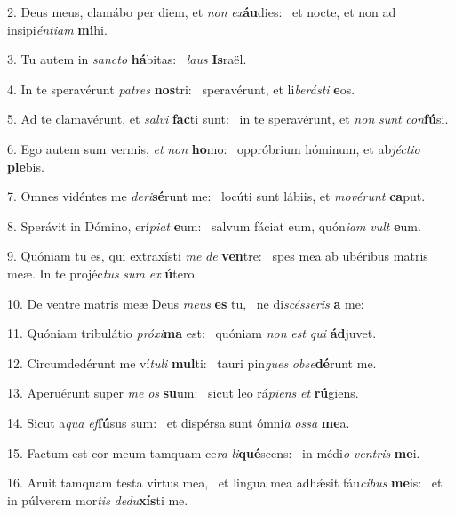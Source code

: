 2. Deus meus, clamábo per diem, et \textit{non} \textit{ex}\textbf{áu}dies: \ast\  et nocte, et non ad insipi\textit{én}\textit{ti}\textit{am} \textbf{mi}hi.\

3. Tu autem in \textit{sanc}\textit{to} \textbf{há}bitas: \ast\  \textit{laus} \textbf{Is}raël.\

4. In te speravérunt \textit{pa}\textit{tres} \textbf{nos}tri: \ast\  speravérunt, et li\textit{be}\textit{rás}\textit{ti} \textbf{e}os.\

5. Ad te clamavérunt, et \textit{sal}\textit{vi} \textbf{fac}ti sunt: \ast\  in te speravérunt, et \textit{non} \textit{sunt} \textit{con}\textbf{fú}si.\

6. Ego autem sum vermis, \textit{et} \textit{non} \textbf{ho}mo: \ast\  oppróbrium hóminum, et ab\textit{jéc}\textit{ti}\textit{o} \textbf{ple}bis.\

7. Omnes vidéntes me \textit{de}\textit{ri}\textbf{sé}runt me: \ast\  locúti sunt lábiis, et \textit{mo}\textit{vé}\textit{runt} \textbf{ca}put.\

8. Sperávit in Dómino, erí\textit{pi}\textit{at} \textbf{e}um: \ast\  salvum fáciat eum, quón\textit{i}\textit{am} \textit{vult} \textbf{e}um.\

9. Quóniam tu es, qui extraxísti \textit{me} \textit{de} \textbf{ven}tre: \ast\  spes mea ab ubéribus matris meæ. In te projéc\textit{tus} \textit{sum} \textit{ex} \textbf{ú}tero.\

10. De ventre matris meæ Deus \textit{me}\textit{us} \textbf{es} tu, \ast\  ne di\textit{scés}\textit{se}\textit{ris} \textbf{a} me:\

11. Quóniam tribulátio \textit{pró}\textit{xi}\textbf{ma} est: \ast\  quóniam \textit{non} \textit{est} \textit{qui} \textbf{ád}juvet.\

12. Circumdedérunt me ví\textit{tu}\textit{li} \textbf{mul}ti: \ast\  tauri pin\textit{gues} \textit{ob}\textit{se}\textbf{dé}runt me.\

13. Aperuérunt super \textit{me} \textit{os} \textbf{su}um: \ast\  sicut leo rá\textit{pi}\textit{ens} \textit{et} \textbf{rú}giens.\

14. Sicut a\textit{qua} \textit{ef}\textbf{fú}sus sum: \ast\  et dispérsa sunt ómni\textit{a} \textit{os}\textit{sa} \textbf{me}a.\

15. Factum est cor meum tamquam ce\textit{ra} \textit{li}\textbf{qué}scens: \ast\  in médi\textit{o} \textit{ven}\textit{tris} \textbf{me}i.\

16. Aruit tamquam testa virtus mea, \dag\  et lingua mea adhǽsit fáu\textit{ci}\textit{bus} \textbf{me}is: \ast\  et in púlverem mor\textit{tis} \textit{de}\textit{du}\textbf{xís}ti me.\

